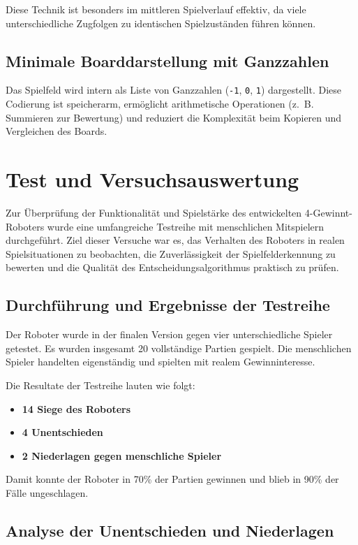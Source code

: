 Diese Technik ist besonders im mittleren Spielverlauf effektiv, da viele unterschiedliche Zugfolgen zu identischen Spielzuständen führen können.

\subsection{Minimale Boarddarstellung mit Ganzzahlen}

Das Spielfeld wird intern als Liste von Ganzzahlen (\texttt{-1}, \texttt{0}, \texttt{1}) dargestellt. Diese Codierung ist speicherarm, ermöglicht arithmetische Operationen (z.~B. Summieren zur Bewertung) und reduziert die Komplexität beim Kopieren und Vergleichen des Boards.

\section{Test und Versuchsauswertung}

Zur Überprüfung der Funktionalität und Spielstärke des entwickelten 4-Gewinnt-Roboters wurde eine umfangreiche Testreihe mit menschlichen Mitspielern durchgeführt. Ziel dieser Versuche war es, das Verhalten des Roboters in realen Spielsituationen zu beobachten, die Zuverlässigkeit der Spielfelderkennung zu bewerten und die Qualität des Entscheidungsalgorithmus praktisch zu prüfen.

\subsection{Durchführung und Ergebnisse der Testreihe}

Der Roboter wurde in der finalen Version gegen vier unterschiedliche Spieler getestet. 
Es wurden insgesamt 20 vollständige Partien gespielt. Die menschlichen Spieler handelten eigenständig und spielten mit realem Gewinninteresse.

Die Resultate der Testreihe lauten wie folgt:

\begin{itemize}
	\item \textbf{14 Siege des Roboters}
	\item \textbf{4 Unentschieden}
	\item \textbf{2 Niederlagen gegen menschliche Spieler}
\end{itemize}

Damit konnte der Roboter in 70\% der Partien gewinnen und blieb in 90\% der Fälle ungeschlagen.

\subsection{Analyse der Unentschieden und Niederlagen}

